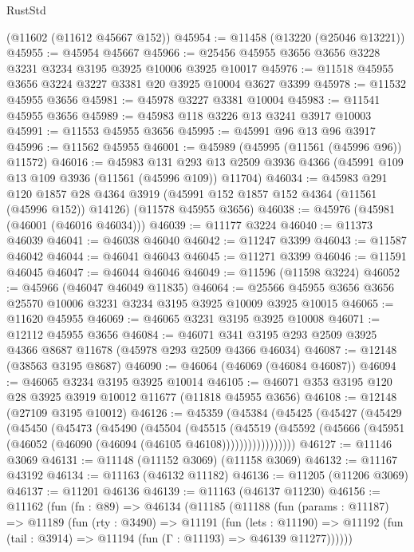 \begin{lexlean}{RustStd}
\begin{coremodule}
    (@11602 (@11612 @45667 @152))
@45954 := @11458 (@13220 (@25046 @13221))
@45955 := @45954 @45667
@45966 := @25456 @45955 @3656 @3656 @3228 @3231 @3234 @3195 @3925 @10006 @3925 @10017
@45976 := @11518 @45955 @3656 @3224 @3227 @3381 @20 @3925 @10004 @3627 @3399
@45978 := @11532 @45955 @3656
@45981 := @45978 @3227 @3381 @10004
@45983 := @11541 @45955 @3656
@45989 := @45983 @118 @3226 @13 @3241 @3917 @10003
@45991 := @11553 @45955 @3656
@45995 := @45991 @96 @13 @96 @3917
@45996 := @11562 @45955
@46001 := @45989 (@45995 (@11561 (@45996 @96)) @11572)
@46016 := @45983
    @131
    @293
    @13
    @2509
    @3936
    @4366
    (@45991 @109 @13 @109 @3936 (@11561 (@45996 @109)) @11704)
@46034 := @45983
    @291
    @120
    @1857
    @28
    @4364
    @3919
    (@45991 @152 @1857 @152 @4364 (@11561 (@45996 @152)) @14126)
    (@11578 @45955 @3656)
@46038 := @45976 (@45981 (@46001 (@46016 @46034)))
@46039 := @11177 @3224
@46040 := @11373 @46039
@46041 := @46038 @46040
@46042 := @11247 @3399
@46043 := @11587 @46042
@46044 := @46041 @46043
@46045 := @11271 @3399
@46046 := @11591 @46045
@46047 := @46044 @46046
@46049 := @11596 (@11598 @3224)
@46052 := @45966 (@46047 @46049 @11835)
@46064 := @25566 @45955 @3656 @3656 @25570 @10006 @3231 @3234 @3195 @3925 @10009 @3925 @10015
@46065 := @11620 @45955
@46069 := @46065 @3231 @3195 @3925 @10008
@46071 := @12112 @45955 @3656
@46084 := @46071 @341 @3195 @293 @2509 @3925 @4366 @8687 @11678 (@45978 @293 @2509 @4366 @46034)
@46087 := @12148 (@38563 @3195 @8687)
@46090 := @46064 (@46069 (@46084 @46087))
@46094 := @46065 @3234 @3195 @3925 @10014
@46105 := @46071 @353 @3195 @120 @28 @3925 @3919 @10012 @11677 (@11818 @45955 @3656)
@46108 := @12148 (@27109 @3195 @10012)
@46126 := @45359
    (@45384
      (@45425
        (@45427
          (@45429
            (@45450
              (@45473
                (@45490
                  (@45504
                    (@45515
                      (@45519
                        (@45592
                          (@45666 (@45951 (@46052 (@46090 (@46094 (@46105 @46108)))))))))))))))))
@46127 := @11146 @3069
@46131 := @11148 (@11152 @3069) (@11158 @3069)
@46132 := @11167 @43192
@46134 := @11163 (@46132 @11182)
@46136 := @11205 (@11206 @3069)
@46137 := @11201 @46136
@46139 := @11163 (@46137 @11230)
@46156 := @11162
    (fun (fn : @89) =>
    @46134
      (@11185
        (@11188
          (fun (params : @11187) =>
          @11189
            (fun (rty : @3490) =>
            @11191
              (fun (lets : @11190) =>
              @11192 (fun (tail : @3914) => @11194 (fun (Γ : @11193) => @46139 @11277))))))

\end{coremodule}
\end{lexlean}
